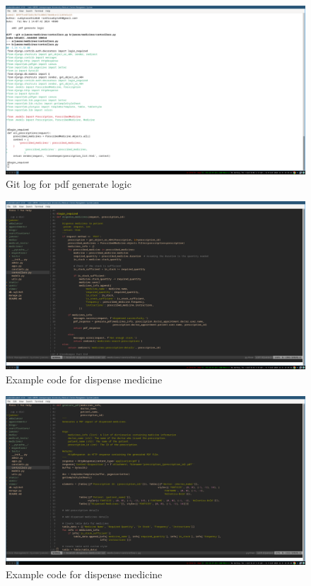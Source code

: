 \documentclass[a4paper,12pt]{article}
\begin{document}
\begin{figure}[H]
    \centering
    \includegraphics[width=1\textwidth]{images/scr2git3.png}
    \caption{Git log for pdf generate logic}
    \label{fig:gitlogscr23}
\end{figure}

\begin{figure}[H]
    \centering
    \includegraphics[width=1\textwidth]{images/scr2examplecode1.png}
    \caption{Example code for dispense medicine}
    \label{fig:scr2code1}
\end{figure}

\begin{figure}[H]
    \centering
    \includegraphics[width=1\textwidth]{images/scr2examplecode2.png}
    \caption{Example code for dispense medicine}
    \label{fig:scr2code2}
\end{figure}
\end{document}
